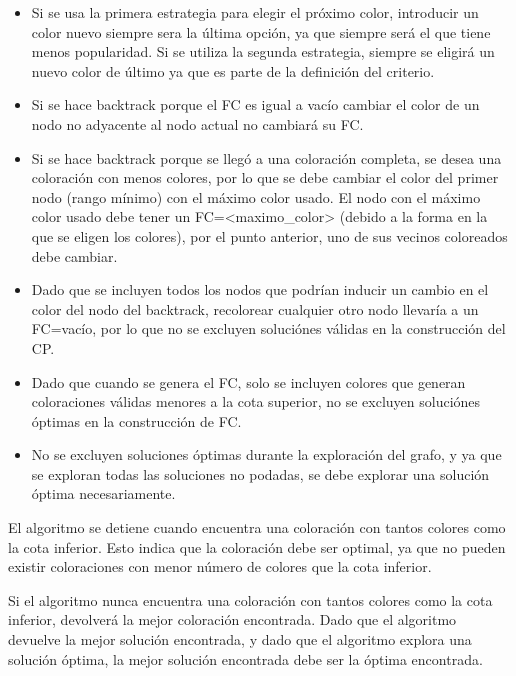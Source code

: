 \documentclass[a4paper,10pt]{article}
\begin{document}
\begin{itemize}
 \item Si se usa la primera estrategia para elegir el pr\'oximo color,
       introducir un color nuevo siempre sera la \'ultima opci\'on, ya que
       siempre ser\'a el que tiene menos popularidad. Si se utiliza la segunda
       estrategia, siempre se eligir\'a un nuevo color de \'ultimo ya que es
       parte de la definici\'on del criterio.\\
 \item Si se hace backtrack porque el FC es igual a vac\'io cambiar el
       color de un nodo no adyacente al nodo actual no cambiar\'a su FC.\\
 \item Si se hace backtrack porque se lleg\'o a una coloraci\'on
       completa, se desea una coloraci\'on con menos colores, por lo que se
       debe cambiar el color del primer nodo (rango mínimo) con el m\'aximo color usado. El nodo
       con el m\'aximo color usado debe tener un FC={<maximo\_color>}
       (debido a la forma en la que se eligen los colores), por el
       punto anterior, uno de sus vecinos coloreados debe cambiar.
 \item Dado que se incluyen todos los nodos que podr\'ian inducir un
       cambio en el color del nodo del backtrack, recolorear cualquier otro
       nodo llevar\'ia a un FC=vac\'io, por lo que no se excluyen soluci\'ones
       v\'alidas en la construcci\'on del CP.
 \item Dado que cuando se genera el FC, solo se incluyen colores que
       generan coloraciones v\'alidas menores a la cota superior, no se
       excluyen soluci\'ones \'optimas en la construcci\'on de FC.
 \item No se excluyen soluciones \'optimas durante la exploraci\'on del
       grafo, y ya que se exploran todas las soluciones no podadas, se
       debe explorar una soluci\'on \'optima necesariamente.
\end{itemize}

El algoritmo se detiene cuando encuentra una coloraci\'on con tantos
colores como la cota inferior. Esto indica que la coloraci\'on debe ser
optimal, ya que no pueden existir coloraciones con menor n\'umero de
colores que la cota inferior.

Si el algoritmo nunca encuentra una coloraci\'on con tantos colores como
la cota inferior, devolver\'a la mejor coloraci\'on encontrada. Dado que
el algoritmo devuelve la mejor soluci\'on encontrada, y dado que el
algoritmo explora una soluci\'on \'optima, la mejor soluci\'on
encontrada debe ser la \'optima encontrada.
\end{document}
